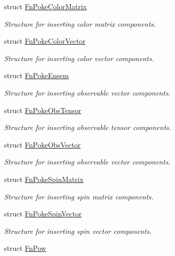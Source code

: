 \begin{DoxyCompactItemize}
struct \mbox{\hyperlink{structENSEM_1_1FnPokeColorMatrix}{Fn\+Poke\+Color\+Matrix}}
\begin{DoxyCompactList}\small\item\em Structure for inserting color matrix components. \end{DoxyCompactList}\item 
struct \mbox{\hyperlink{structENSEM_1_1FnPokeColorVector}{Fn\+Poke\+Color\+Vector}}
\begin{DoxyCompactList}\small\item\em Structure for inserting color vector components. \end{DoxyCompactList}\item 
struct \mbox{\hyperlink{structENSEM_1_1FnPokeEnsem}{Fn\+Poke\+Ensem}}
\begin{DoxyCompactList}\small\item\em Structure for inserting observable vector components. \end{DoxyCompactList}\item 
struct \mbox{\hyperlink{structENSEM_1_1FnPokeObsTensor}{Fn\+Poke\+Obs\+Tensor}}
\begin{DoxyCompactList}\small\item\em Structure for inserting observable tensor components. \end{DoxyCompactList}\item 
struct \mbox{\hyperlink{structENSEM_1_1FnPokeObsVector}{Fn\+Poke\+Obs\+Vector}}
\begin{DoxyCompactList}\small\item\em Structure for inserting observable vector components. \end{DoxyCompactList}\item 
struct \mbox{\hyperlink{structENSEM_1_1FnPokeSpinMatrix}{Fn\+Poke\+Spin\+Matrix}}
\begin{DoxyCompactList}\small\item\em Structure for inserting spin matrix components. \end{DoxyCompactList}\item 
struct \mbox{\hyperlink{structENSEM_1_1FnPokeSpinVector}{Fn\+Poke\+Spin\+Vector}}
\begin{DoxyCompactList}\small\item\em Structure for inserting spin vector components. \end{DoxyCompactList}\item 
struct \mbox{\hyperlink{structENSEM_1_1FnPow}{Fn\+Pow}}
\item 

\end{DoxyCompactItemize}

